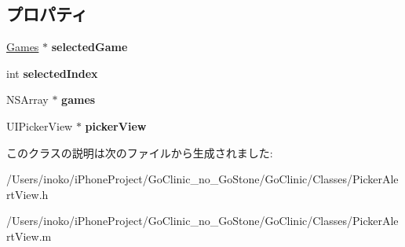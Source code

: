 \subsection*{プロパティ}
\begin{DoxyCompactItemize}
\item 
\hypertarget{interface_picker_alert_view_a2cb1c29a88dded150a2bdc5fb2a19553}{
\hyperlink{interface_games}{Games} $\ast$ {\bfseries selectedGame}}
\label{interface_picker_alert_view_a2cb1c29a88dded150a2bdc5fb2a19553}

\item 
\hypertarget{interface_picker_alert_view_a766d2add07dbe438f43f8ca360ee91cc}{
int {\bfseries selectedIndex}}
\label{interface_picker_alert_view_a766d2add07dbe438f43f8ca360ee91cc}

\item 
\hypertarget{interface_picker_alert_view_a96544b6ce55302d60a52388dd1b040bc}{
NSArray $\ast$ {\bfseries games}}
\label{interface_picker_alert_view_a96544b6ce55302d60a52388dd1b040bc}

\item 
\hypertarget{interface_picker_alert_view_aa6097903071c8ebbd99c1735305f08c9}{
UIPickerView $\ast$ {\bfseries pickerView}}
\label{interface_picker_alert_view_aa6097903071c8ebbd99c1735305f08c9}

\end{DoxyCompactItemize}


このクラスの説明は次のファイルから生成されました:\begin{DoxyCompactItemize}
\item 
/Users/inoko/iPhoneProject/GoClinic\_\-no\_\-GoStone/GoClinic/Classes/PickerAlertView.h\item 
/Users/inoko/iPhoneProject/GoClinic\_\-no\_\-GoStone/GoClinic/Classes/PickerAlertView.m\end{DoxyCompactItemize}
